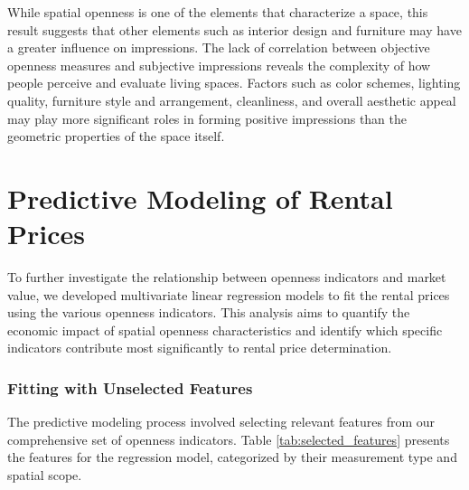 While spatial openness is one of the elements that characterize a space, this result suggests that 
other elements such as interior design and furniture may have a greater influence on impressions. The 
lack of correlation between objective openness measures and subjective impressions reveals the 
complexity of how people perceive and evaluate living spaces. Factors such as color schemes, lighting 
quality, furniture style and arrangement, cleanliness, and overall aesthetic appeal may play more 
significant roles in forming positive impressions than the geometric properties of the space itself.




\section{Predictive Modeling of Rental Prices}

To further investigate the relationship between openness indicators and market value, we developed 
multivariate linear regression models to fit the rental prices using the various openness indicators. 
This analysis aims to quantify the economic impact of spatial openness characteristics and identify 
which specific indicators contribute most significantly to rental price determination.

\subsubsection{Fitting with Unselected Features }
The predictive modeling process involved selecting relevant features from our comprehensive set of 
openness indicators. Table \ref{tab:selected_features} presents the features for the 
regression model, categorized by their measurement type and spatial scope.


